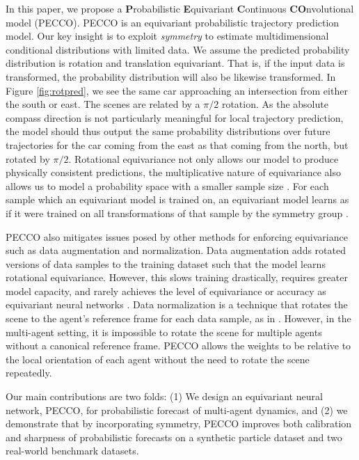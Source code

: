 In this paper, we propose a \textbf{P}robabilistic \textbf{E}quivariant \textbf{C}ontinuous \textbf{CO}nvolutional model (PECCO). PECCO is an equivariant probabilistic trajectory prediction model. Our key insight is to exploit \textit{symmetry} to estimate multidimensional conditional distributions with limited data.  We assume the predicted probability distribution is rotation and translation equivariant. That is, if the input data is transformed, the probability distribution will also be likewise transformed. In Figure \ref{fig:rotpred}, we see the same car approaching an intersection from either the south or east. The scenes are related by a $\pi/2$ rotation.  As the absolute compass direction is not particularly meaningful for local trajectory prediction, the model should thus output the same probability distributions over future trajectories for the car coming from the east as that coming from the north, but rotated by $\pi/2$.  Rotational equivariance not only allows our model to produce physically consistent predictions, the multiplicative nature of equivariance also allows us to model a probability space with a smaller sample size \cite{JMLR:v21:19-322}. For each sample which an equivariant model is trained on, an equivariant model learns as if it were trained on all transformations of that sample by the symmetry group \cite{wang2020incorporating}. 


PECCO also mitigates issues posed by other methods for enforcing equivariance such as data augmentation and normalization. Data augmentation adds rotated versions of data samples to the training dataset such that the model learns rotational equivariance. However, this slows training drastically, requires greater model capacity, and rarely achieves the level of equivariance or accuracy as equivariant neural networks \cite{trajectron++}. Data normalization is a technique that rotates the scene to the agent's reference frame for each data sample, as in \cite{vectornet}.  However, in the multi-agent setting, it is impossible to rotate the scene for multiple agents without a canonical reference frame. PECCO allows the weights to be relative to the local orientation of each agent without the need to rotate the scene repeatedly.   


Our main contributions are two folds: (1) We design an equivariant neural network, PECCO, for probabilistic forecast of multi-agent dynamics, and (2) we demonstrate that by incorporating symmetry, PECCO improves both calibration and sharpness of probabilistic forecasts on a synthetic particle dataset and two real-world benchmark datasets. 



